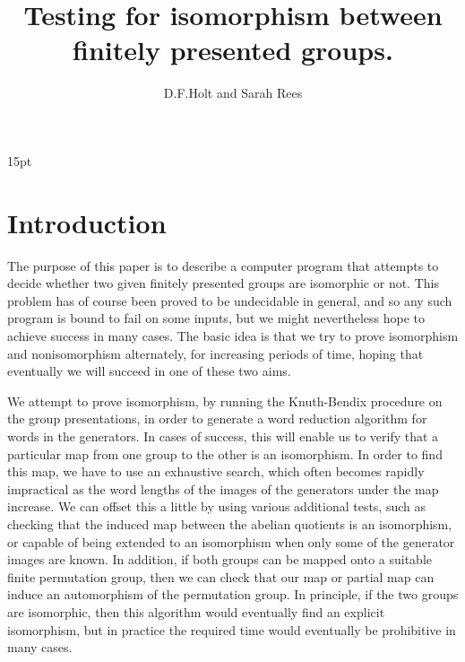 \title{ Testing for isomorphism between finitely presented groups.}
\author{ D.F.Holt and Sarah Rees} 
\setlength{\textwidth}{13.8cm}
\setlength{\topmargin}{0.5cm}
\setlength{\headheight}{0cm}
\setlength{\headsep}{0cm}
\setlength{\topskip}{0cm}
\setlength{\textheight}{21.7cm}
\setlength{\oddsidemargin}{1.3cm}
\setlength{\evensidemargin}{1.3cm}
\setlength{\labelwidth}{0cm}
\setlength{\leftmargin}{0cm}
\setlength{\listparindent}{0cm}
\setlength{\baselineskip} {15pt}
\newtheorem{lemma}{Lemma}[section]
\newenvironment{proof}{\normalsize {\sc Proof}:}{{\hfill $\Box$}}


\maketitle
\section{Introduction}

The purpose of this paper is to describe a
computer program that attempts to decide whether two given finitely
presented groups are isomorphic or not. This problem has of course
been proved to be undecidable in general, and so any such program is
bound to fail on some inputs, but we might nevertheless hope to achieve
success in many cases. The basic idea is that we try to
prove isomorphism and nonisomorphism alternately, for increasing periods of
time, hoping that eventually we will succeed in one of these two aims.

We attempt to prove isomorphism, by running the Knuth-Bendix procedure on the
group presentations, in order to generate a word reduction algorithm for
words in the generators. In cases of success, this will enable us to verify that
a particular map from one group to the other is an isomorphism. In order to
find this map, we have to use an exhaustive search, which often becomes
rapidly impractical as the word lengths of the images of the generators under
the map increase. We can offset this a little by using various additional tests,
such as checking that the induced map between the abelian quotients is
an isomorphism, or capable of being extended to an isomorphism when only
some of the generator images are known. In addition, if both groups can be
mapped onto a suitable finite permutation group, then we can check that our
map or partial map can induce an automorphism of the permutation group. In
principle, if the two groups are isomorphic, then this algorithm would
eventually find an explicit isomorphism, but in practice the required time
would eventually be prohibitive in many cases.

